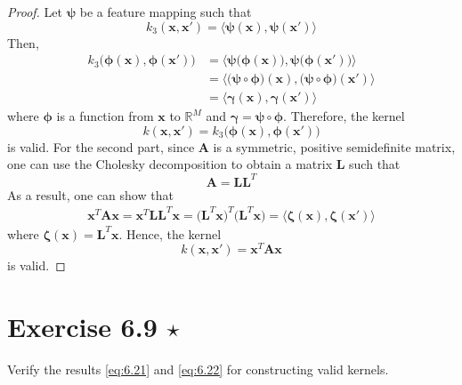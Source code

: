 \begin{proof}
    Let $\bm{\psi}$ be a feature mapping such that
    \[
        k_3(\mathbf{x}, \mathbf{x}') 
        = \langle \bm{\psi}(\mathbf{x}), \bm{\psi}(\mathbf{x}') \rangle
    \] 
    Then,
    \begin{align*}
        k_3\big(\bm{\phi}(\mathbf{x}), \bm{\phi}(\mathbf{x}')\big)
        &= \langle \bm{\psi}\big(\bm{\phi}(\mathbf{x})\big),
            \bm{\psi}\big(\bm{\phi}(\mathbf{x}')\big)\rangle \\
        &= \langle \big(\bm{\psi} \circ \bm{\phi}\big)(\mathbf{x}),
            \big(\bm{\psi} \circ \bm{\phi}\big)(\mathbf{x}')\rangle \\
        &= \langle \bm{\gamma}(\mathbf{x}), \bm{\gamma}(\mathbf{x}')\rangle
    \end{align*}
    where $\bm{\phi}$ is a function from $\mathbf{x}$ to $\mathbb{R}^M$ and
    $\bm{\gamma} = \bm{\psi} \circ \bm{\phi}$. Therefore, the kernel
    \begin{equation*}
        k(\mathbf{x}, \mathbf{x}') = k_3\big(\bm{\phi}(\mathbf{x}),
        \bm{\phi}(\mathbf{x}')\big)
        \tag{6.19}\label{eq:6.19} 
    \end{equation*}
    is valid. For the second part, since $\mathbf{A}$ is a 
    symmetric, positive semidefinite matrix, one can use the Cholesky
    decomposition to obtain a matrix $\mathbf{L}$ such that
    \[
        \mathbf{A} = \mathbf{L} \mathbf{L}^T
    \] 
    As a result, one can show that
    \begin{align*}
        \mathbf{x}^T \mathbf{A} \mathbf{x}
        = \mathbf{x}^T \mathbf{L} \mathbf{L}^T \mathbf{x}
        = \big(\mathbf{L}^T \mathbf{x}\big)^T \big(\mathbf{L}^T \mathbf{x}\big)
        = \langle \bm{\zeta}(\mathbf{x}), \bm{\zeta}(\mathbf{x}') \rangle
    \end{align*}
    where $\bm{\zeta}(\mathbf{x}) = \mathbf{L}^T \mathbf{x}$.
    Hence, the kernel
    \begin{equation*}
        k(\mathbf{x}, \mathbf{x}') = \mathbf{x}^T \mathbf{A} \mathbf{x}
        \tag{6.20}\label{eq:6.20}
    \end{equation*}
    is valid.
\end{proof} 

\section*{Exercise 6.9 $\star$}
Verify the results \eqref{eq:6.21} and \eqref{eq:6.22} for constructing valid kernels.

